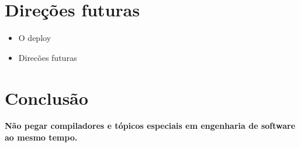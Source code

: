 \documentclass[hyperref={pdfpagelabels=false},11pt]{beamer}
\begin{document}
		\section{Direções futuras}
			\begin{frame}
				\begin{itemize}
					\item{O deploy}
					\item{Direcões futuras}
				\end{itemize}
			\end{frame}
		
		\section{Conclusão}
			\begin{center}
				\textbf{Não pegar compiladores e tópicos especiais em engenharia de software ao mesmo tempo.}
			\end{center}
\end{document}
